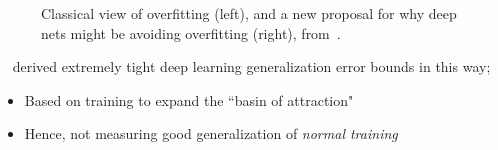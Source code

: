 \begin{figure}
    \centering
    \caption{Classical view of overfitting (left), and a new proposal for why deep nets might be avoiding overfitting (right), from~\citet{belkin2018overfitting}.}
    \label{fig:overfitting}
\end{figure}

~\citet{dziugaite2017entropy} derived extremely tight deep learning generalization error bounds in this way;
\begin{itemize}
    \item Based on training to expand the ``basin of attraction"
    \item Hence, not measuring good generalization of {\it normal training}
\end{itemize}

